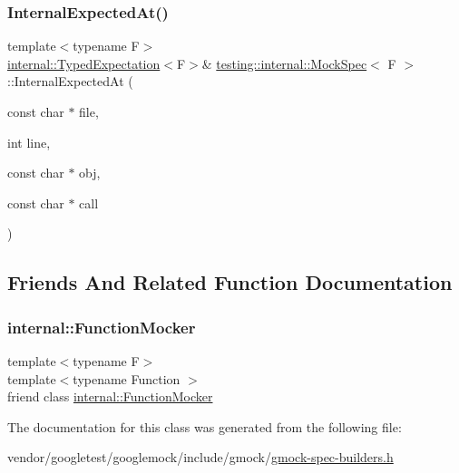 \mbox{\label{classtesting_1_1internal_1_1_mock_spec_a503a434637634014b9bb6c5d68fd336c}} 
\subsubsection{\texorpdfstring{Internal\+Expected\+At()}{InternalExpectedAt()}}
{\footnotesize\ttfamily template$<$typename F$>$ \\
\hyperlink{classtesting_1_1internal_1_1_typed_expectation}{internal\+::\+Typed\+Expectation}$<$F$>$\& \hyperlink{classtesting_1_1internal_1_1_mock_spec}{testing\+::internal\+::\+Mock\+Spec}$<$ F $>$\+::Internal\+Expected\+At (\begin{DoxyParamCaption}\item[{const char $\ast$}]{file,  }\item[{int}]{line,  }\item[{const char $\ast$}]{obj,  }\item[{const char $\ast$}]{call }\end{DoxyParamCaption})\hspace{0.3cm}{\ttfamily [inline]}}



\subsection{Friends And Related Function Documentation}
\mbox{\label{classtesting_1_1internal_1_1_mock_spec_a6980863fff8693124aff79c507f87d45}} 
\subsubsection{\texorpdfstring{internal\+::\+Function\+Mocker}{internal::FunctionMocker}}
{\footnotesize\ttfamily template$<$typename F$>$ \\
template$<$typename Function $>$ \\
friend class \hyperlink{classtesting_1_1internal_1_1_function_mocker}{internal\+::\+Function\+Mocker}\hspace{0.3cm}{\ttfamily [friend]}}



The documentation for this class was generated from the following file\+:\begin{DoxyCompactItemize}
\item 
vendor/googletest/googlemock/include/gmock/\hyperlink{gmock-spec-builders_8h}{gmock-\/spec-\/builders.\+h}\end{DoxyCompactItemize}
